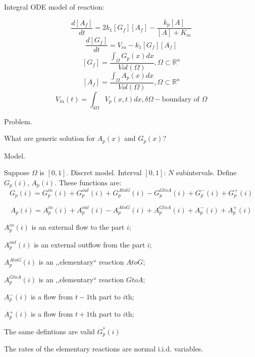 \documentclass[11pt,a4paper]{article}
\author{Irus Grinis}
\begin{document}
Integral ODE model of reaction:


$$ \frac{d[A_f]}{dt} = 2k_1[G_f][A_f] - \frac{k_p[A]}{[A]+K_m}$$ 
$$ \frac{d[G_f]}{dt} = V_{in} - k_1[G_f][A_f]$$
$$ [G_f] = \frac{\int_{\Omega} G_p(x)dx}{Vol(\Omega)}, \Omega \subset \mathbb{R}^n $$
$$ [A_f] = \frac{\int_{\Omega} A_p(x)dx}{Vol(\Omega)}, \Omega \subset \mathbb{R}^n $$
$$ V_{in}(t) = \int_{\delta \Omega} V_p(x,t)dx, \delta \Omega - \mbox{boundary of } \Omega $$

Problem.

What are generic solution for $A_p(x)$ and $G_p(x)$?
 
Model.

 
Suppose $\Omega$ is $[0,1]$.
Discret model. 
Interval $[0,1]$:  $N$ subintervals. Define  $G_p(i)$, $A_p(i)$. These  functions are:
$$G_p(i)=G_p^{in}(i) + G_p^{out}(i) + G_p^{AtoG}(i) - G_p^{GtoA}(i) + G_p^{-}(i)+G_p^{+}(i)$$

$$A_p(i)=A_p^{in}(i) + A_p^{out}(i) - A_p^{AtoG}(i) + A_p^{GtoA}(i) + A_p^{-}(i)+A_p^{+}(i)$$

$A_p^{in}(i)$ is an external flow to the part $i$;

$A_p^{out}(i)$ is an external outflow from the part $i$;

$A_p^{AtoG}(i)$ is an ,,elementary``  reaction $A to G$;  

$A_p^{GtoA}(i)$ is an ,,elementary``  reaction $G to A$;

$A_p^{-}(i)$ is a flow from $t-1$th part to $i$th;

$A_p^{+}(i)$ is a flow from $t+1$th part to $i$th;

The same defintions are valid $G_p^*(i)$   

The rates of the elementary reactions are normal i.i.d. variables.
\end{document}

